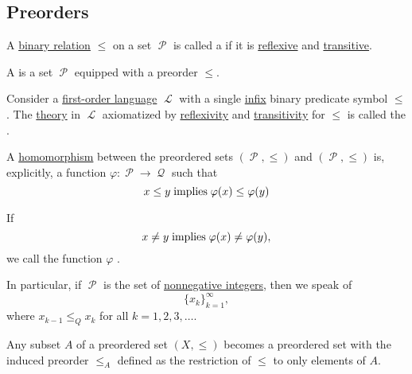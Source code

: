 \subsection{Preorders}\label{subsec:preorders}

\begin{definition}\label{def:preordered_set}
  A \hyperref[def:binary_relation]{binary relation} \( \leq \) on a set \( \mscrP \) is called a  if it is \hyperref[def:binary_relation/reflexive]{reflexive} and \hyperref[def:binary_relation/transitive]{transitive}.

  A  is a set \( \mscrP \) equipped with a preorder \( \leq \).

  \begin{thmenum}[series=def:preordered_set]
     Consider a \hyperref[def:first_order_language]{first-order language} \( \mscrL \) with a single \hyperref[rem:order_infix_notation]{infix} binary predicate symbol \( \leq \). The \hyperref[def:first_order_semantics/theory]{theory} in \( \mscrL \) axiomatized by \hyperref[def:binary_relation/reflexive]{reflexivity} and \hyperref[def:binary_relation/transitive]{transitivity} for \( \leq \) is called the .

     A \hyperref[def:first_order_homomorphism]{homomorphism} between the preordered sets \( (\mscrP, \leq) \) and \( (\mscrP, \leq) \) is, explicitly, a function \( \varphi: \mscrP \to \mscrQ \) such that
    \begin{equation}\label{eq:def:preordered_set/homomorphism}
      x \leq y \thickspace \text{implies} \thickspace \varphi(x) \leq \varphi(y)
    \end{equation}

    If
    \begin{equation*}
      x \neq y \thickspace \text{implies} \thickspace \varphi(x) \neq \varphi(y),
    \end{equation*}
    we call the function \( \varphi \) .

    In particular, if \( \mscrP \) is the set of \hyperref[rem:peano_arithmetic_zero/nonnegative]{nonnegative integers}, then we speak of 
    \begin{equation*}
      \{ x_k \}_{k=1}^\infty,
    \end{equation*}
    where \( x_{k-1} \leq_Q x_k \) for all \( k = 1, 2, 3, \ldots \).

     Any subset \( A \) of a preordered set \( (X, \leq) \) becomes a preordered set with the induced preorder \( \leq_A \) defined as the restriction of \( \leq \) to only elements of \( A \).


\end{thmenum}
\end{definition}
